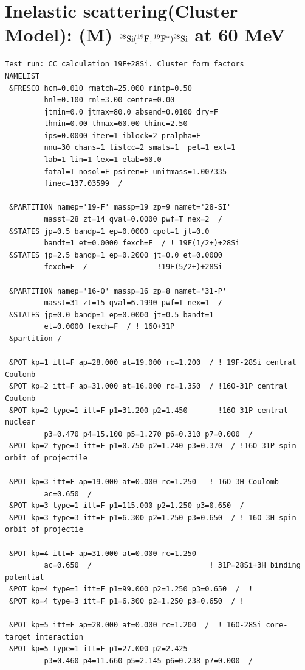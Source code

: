 \documentclass[11pt]{book}
\begin{document}
\section{Inelastic scattering(Cluster Model): (M) 
  $^{28}{\rm Si}({}^{19}{\rm F},{}^{19}{\rm F}^*)^{28}{\rm Si}$
  at 60 MeV}
\begin{small} 
\begin{lstlisting}[frame=single]
Test run: CC calculation 19F+28Si. Cluster form factors
NAMELIST
 &FRESCO hcm=0.010 rmatch=25.000 rintp=0.50
         hnl=0.100 rnl=3.00 centre=0.00 
         jtmin=0.0 jtmax=80.0 absend=0.0100 dry=F 
         thmin=0.00 thmax=60.00 thinc=2.50 
         ips=0.0000 iter=1 iblock=2 pralpha=F
         nnu=30 chans=1 listcc=2 smats=1  pel=1 exl=1
         lab=1 lin=1 lex=1 elab=60.0
         fatal=T nosol=F psiren=F unitmass=1.007335
         finec=137.03599  /

 &PARTITION namep='19-F' massp=19 zp=9 namet='28-SI'
         masst=28 zt=14 qval=0.0000 pwf=T nex=2  /
 &STATES jp=0.5 bandp=1 ep=0.0000 cpot=1 jt=0.0
         bandt=1 et=0.0000 fexch=F  / ! 19F(1/2+)+28Si
 &STATES jp=2.5 bandp=1 ep=0.2000 jt=0.0 et=0.0000
         fexch=F  /                !19F(5/2+)+28Si

 &PARTITION namep='16-O' massp=16 zp=8 namet='31-P'
         masst=31 zt=15 qval=6.1990 pwf=T nex=1  /
 &STATES jp=0.0 bandp=1 ep=0.0000 jt=0.5 bandt=1
         et=0.0000 fexch=F  / ! 16O+31P
 &partition /
 
 &POT kp=1 itt=F ap=28.000 at=19.000 rc=1.200  / ! 19F-28Si central Coulomb
 &POT kp=2 itt=F ap=31.000 at=16.000 rc=1.350  / !16O-31P central Coulomb
 &POT kp=2 type=1 itt=F p1=31.200 p2=1.450       !16O-31P central nuclear 
         p3=0.470 p4=15.100 p5=1.270 p6=0.310 p7=0.000  /
 &POT kp=2 type=3 itt=F p1=0.750 p2=1.240 p3=0.370  / !16O-31P spin-orbit of projectile
 
 &POT kp=3 itt=F ap=19.000 at=0.000 rc=1.250   ! 16O-3H Coulomb
         ac=0.650  /
 &POT kp=3 type=1 itt=F p1=115.000 p2=1.250 p3=0.650  /
 &POT kp=3 type=3 itt=F p1=6.300 p2=1.250 p3=0.650  / ! 16O-3H spin-orbit of projectie
 
 &POT kp=4 itt=F ap=31.000 at=0.000 rc=1.250
         ac=0.650  /                           ! 31P=28Si+3H binding potential
 &POT kp=4 type=1 itt=F p1=99.000 p2=1.250 p3=0.650  /  !
 &POT kp=4 type=3 itt=F p1=6.300 p2=1.250 p3=0.650  / ! 
 
 &POT kp=5 itt=F ap=28.000 at=0.000 rc=1.200  /  ! 16O-28Si core-target interaction
 &POT kp=5 type=1 itt=F p1=27.000 p2=2.425
         p3=0.460 p4=11.660 p5=2.145 p6=0.238 p7=0.000  /
 

\end{lstlisting}
\end{small}
\end{document}

